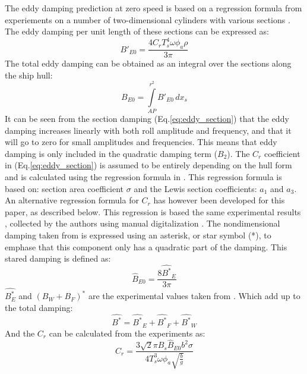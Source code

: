 The eddy damping prediction at zero speed is based on a regression
formula from experiements on a number of two-dimensional cylinders with
various sections \citep{7505983/4AFVVGNT}. The eddy damping per unit
length of these sections can be expressed as:
\begin{equation}
B'_{E0} = \frac{4 C_{r} T_{s}^{4} \omega \phi_{a} \rho}{3 \pi}
\label{eq:eddy_section}
\end{equation}
The total eddy damping can be obtained as an integral over the sections
along the ship hull:
\begin{equation}
B_{E0} = \int\limits_{AP}^{r^{2}} B'_{E0}\, dx_{s}
\label{eq:eddy_integration}
\end{equation}
It can be seen from the section damping
(Eq.\ref{eq:eddy_section}) that the eddy damping increases
linearly with both roll amplitude and frequency, and that it will go to
zero for small amplitudes and frequencies. This means that eddy damping
is only included in the quadratic damping term ($B_2$). The $C_r$
coefficient in (Eq.\ref{eq:eddy_section}) is assumed to be
entirely depending on the hull form and is calculated using the
regression formula in \citep{7505983/4AFVVGNT}. This regression formula
is based on: section area coefficient $\sigma$ and the Lewis section
coefficients: $a_1$ and $a_3$. An alternative regression formula for
$C_r$ has however been developed for this paper, as described below.
This regression is based the same experimental results
\citep{7505983/4AFVVGNT}, collected by the authors using manual
digitalization \citep{7505983/8YUE24LM}.
The nondimensional damping taken from \citep{7505983/4AFVVGNT} is
expressed using an asterisk, or star symbol (*), to emphase that this
component only has a quadratic part of the damping. This stared damping
is defined as:
\begin{equation}
\hat{B}_{E0} = \frac{8 \hat{B^*}_{E}}{3 \pi}
\label{eq:B_E_star_hat}
\end{equation}
$\hat{B_E^*}$ and $(B_W+B_F)^*$ are the experimental values taken
from \citep{7505983/4AFVVGNT}. Which add up to the total damping:
\begin{equation}
\hat{B^*} = \hat{B^*}_{E} + \hat{B^*}_{F} + \hat{B^*}_{W}
\label{eq:B_star_hat}
\end{equation}
And the $C_r$ can be calculated from the experiments as:
\begin{equation}
C_{r} = \frac{3 \sqrt{2} \pi B_{s} \hat{B}_{E0} b^{2} \sigma}{4 T_{s}^{3} \omega \phi_{a} \sqrt{\frac{b}{g}}}
\label{eq:C_r_2}
\end{equation}
